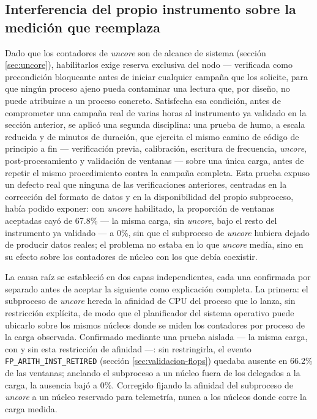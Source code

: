 \documentclass[12pt,oneside,spanish]{book}
\begin{document}
\subsection{Interferencia del propio instrumento sobre la medición que reemplaza}
\label{sec:resultados-interferencia-uncore}

Dado que los contadores de \textit{uncore} son de alcance de sistema (sección \ref{sec:uncore}), habilitarlos exige reserva exclusiva del nodo --- verificada como precondición bloqueante antes de iniciar cualquier campaña que los solicite, para que ningún proceso ajeno pueda contaminar una lectura que, por diseño, no puede atribuirse a un proceso concreto. Satisfecha esa condición, antes de comprometer una campaña real de varias horas al instrumento ya validado en la sección anterior, se aplicó una segunda disciplina: una prueba de humo, a escala reducida y de minutos de duración, que ejercita el mismo camino de código de principio a fin --- verificación previa, calibración, escritura de frecuencia, \textit{uncore}, post-procesamiento y validación de ventanas --- sobre una única carga, antes de repetir el mismo procedimiento contra la campaña completa. Esta prueba expuso un defecto real que ninguna de las verificaciones anteriores, centradas en la corrección del formato de datos y en la disponibilidad del propio subproceso, había podido exponer: con \textit{uncore} habilitado, la proporción de ventanas aceptadas cayó de 67.8\% --- la misma carga, sin \textit{uncore}, bajo el resto del instrumento ya validado --- a 0\%, sin que el subproceso de \textit{uncore} hubiera dejado de producir datos reales; el problema no estaba en lo que \textit{uncore} medía, sino en su efecto sobre los contadores de núcleo con los que debía coexistir.

La causa raíz se estableció en dos capas independientes, cada una confirmada por separado antes de aceptar la siguiente como explicación completa. La primera: el subproceso de \textit{uncore} hereda la afinidad de CPU del proceso que lo lanza, sin restricción explícita, de modo que el planificador del sistema operativo puede ubicarlo sobre los mismos núcleos donde se miden los contadores por proceso de la carga observada. Confirmado mediante una prueba aislada --- la misma carga, con y sin esta restricción de afinidad ---: sin restringirla, el evento \texttt{FP\_ARITH\_INST\_RETIRED} (sección \ref{sec:validacion-flops}) quedaba ausente en 66.2\% de las ventanas; anclando el subproceso a un núcleo fuera de los delegados a la carga, la ausencia bajó a 0\%. Corregido fijando la afinidad del subproceso de \textit{uncore} a un núcleo reservado para telemetría, nunca a los núcleos donde corre la carga medida.
\end{document}
